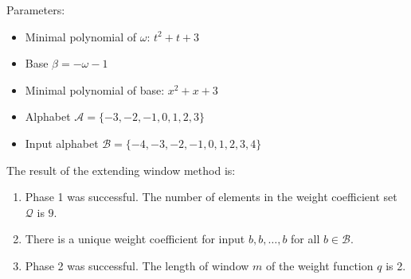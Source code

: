 \begin{exmp}
\label{ex:integerAA}

Parameters:
\begin{itemize}
    \item Minimal polynomial of $\omega$: $t^2 + t + 3$
    \item Base $\beta= -\omega - 1 $
    \item Minimal polynomial of base: $x^2 + x + 3$
    \item Alphabet $\mathcal{A} = \{-3, -2, -1, 0, 1, 2, 3\} $
    \item Input alphabet $\mathcal{B} = \{-4, -3, -2, -1, 0, 1, 2, 3, 4\} $
\end{itemize}

The result of the extending window method is:
\begin{enumerate}
    \item Phase 1 was successful.
The number of elements in the weight coefficient set $\mathcal{Q}$ is $ 9 $.

    \item There is a unique weight coefficient for input $b,b,\dots,b$ for all $b\in\mathcal{B}$.

    \item Phase 2 was successful.
The length of window $m$ of the weight function $q$ is  2.
\end{enumerate}
\end{exmp}